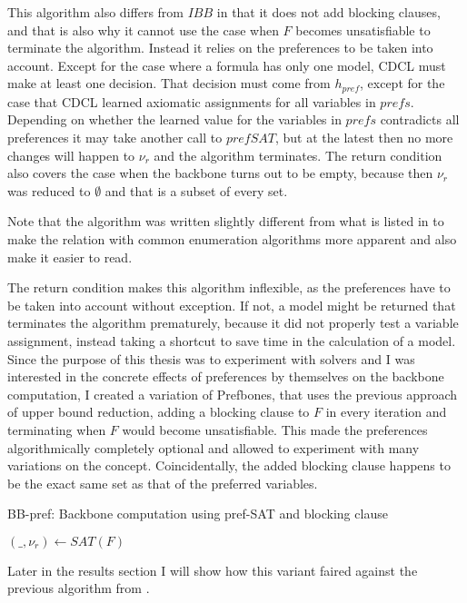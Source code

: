 This algorithm also differs from $IBB$ in that it does not add blocking clauses, and that is also why it cannot use the case when $F$ becomes unsatisfiable to terminate the algorithm. Instead it relies on the preferences to be taken into account. Except for the case where a formula has only one model, CDCL must make at least one decision. That decision must come from $h_{pref}$, except for the case that CDCL learned axiomatic assignments for all variables in $prefs$. Depending on whether the learned value for the variables in $prefs$ contradicts all preferences it may take another call to $prefSAT$, but at the latest then no more changes will happen to $\nu_r$ and the algorithm terminates. The return condition also covers the case when the backbone turns out to be empty, because then $\nu_r$ was reduced to $\emptyset$ and that is a subset of every set.

Note that the algorithm was written slightly different from what is listed in \cite{PJ18} to make the relation with common enumeration algorithms more apparent and also make it easier to read.

The return condition makes this algorithm inflexible, as the preferences have to be taken into account without exception. If not, a model might be returned that terminates the algorithm prematurely, because it did not properly test a variable assignment, instead taking a shortcut to save time in the calculation of a model. Since the purpose of this thesis was to experiment with solvers and I was interested in the concrete effects of preferences by themselves on the backbone computation, I created a variation of Prefbones, that uses the previous approach of upper bound reduction, adding a blocking clause to $F$ in every iteration and terminating when $F$ would become unsatisfiable. This made the preferences algorithmically completely optional and allowed to experiment with many variations on the concept. Coincidentally, the added blocking clause happens to be the exact same set as that of the preferred variables.

\begin{algorithm}
\caption{{\sc BB-pref: Backbone computation using pref-SAT and blocking clause}}
\label{alg:blockPref}
\DontPrintSemicolon
{}

$(\_,\nu_r) \gets SAT(F)$\;

\end{algorithm}

Later in the results section I will show how this variant faired against the previous algorithm from \cite{PJ18}.